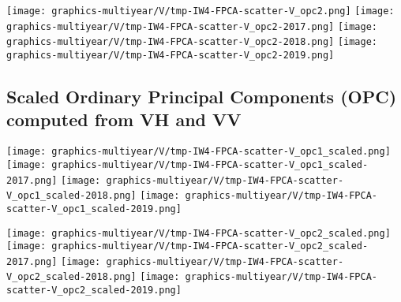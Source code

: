 
\clearpage
\begin{center}
\begin{minipage}{7.0in}
\texttt{[image: graphics-multiyear/V/tmp-IW4-FPCA-scatter-V\_opc2.png]}
\quad
\texttt{[image: graphics-multiyear/V/tmp-IW4-FPCA-scatter-V\_opc2-2017.png]}
\vskip 1.0cm
\texttt{[image: graphics-multiyear/V/tmp-IW4-FPCA-scatter-V\_opc2-2018.png]}
\quad
\texttt{[image: graphics-multiyear/V/tmp-IW4-FPCA-scatter-V\_opc2-2019.png]}
\end{minipage}
\end{center}


\clearpage

\subsection{Scaled Ordinary Principal Components (OPC) computed from VH and VV}
\label{FPCA-scatter-opc-scaled-IW4}

\begin{center}
\begin{minipage}{7.0in}
\texttt{[image: graphics-multiyear/V/tmp-IW4-FPCA-scatter-V\_opc1\_scaled.png]}
\quad
\texttt{[image: graphics-multiyear/V/tmp-IW4-FPCA-scatter-V\_opc1\_scaled-2017.png]}
\vskip 1.0cm
\texttt{[image: graphics-multiyear/V/tmp-IW4-FPCA-scatter-V\_opc1\_scaled-2018.png]}
\quad
\texttt{[image: graphics-multiyear/V/tmp-IW4-FPCA-scatter-V\_opc1\_scaled-2019.png]}
\end{minipage}
\end{center}


\clearpage
\begin{center}
\begin{minipage}{7.0in}
\texttt{[image: graphics-multiyear/V/tmp-IW4-FPCA-scatter-V\_opc2\_scaled.png]}
\quad
\texttt{[image: graphics-multiyear/V/tmp-IW4-FPCA-scatter-V\_opc2\_scaled-2017.png]}
\vskip 1.0cm
\texttt{[image: graphics-multiyear/V/tmp-IW4-FPCA-scatter-V\_opc2\_scaled-2018.png]}
\quad
\texttt{[image: graphics-multiyear/V/tmp-IW4-FPCA-scatter-V\_opc2\_scaled-2019.png]}
\end{minipage}
\end{center}


\renewcommand{\theenumi}{\roman{enumi}}
\renewcommand{\labelenumi}{\textnormal{(\theenumi)}$\;\;$}

